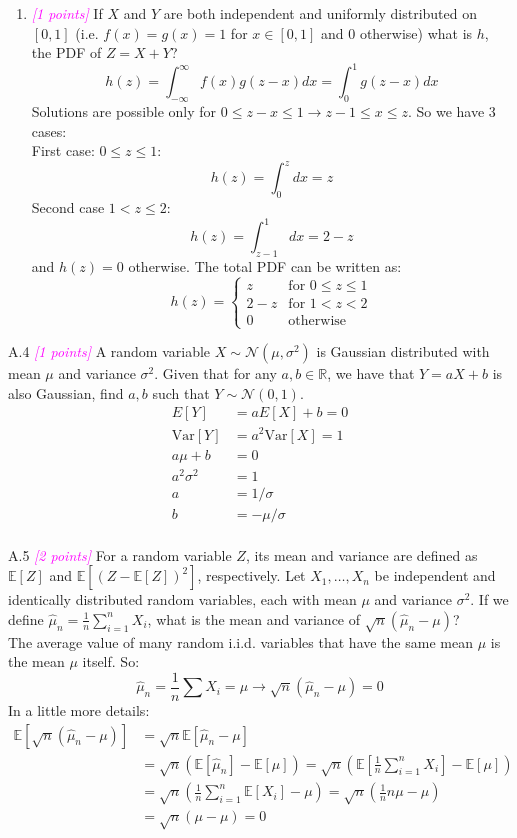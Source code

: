 \documentclass{article}
\newcommand{\field}[1]{\mathbb{#1}}
\newcommand{\1}{\mathbf{1}}
\newcommand{\E}{\mathbb{E}}
\newcommand{\R}{\field{R}} %
\newcommand{\points}[1]{\small\textcolor{magenta}{\emph{[#1 points]}} \normalsize}
\begin{document}
\begin{enumerate}
	\item \points{1} If $X$ and $Y$ are both independent and uniformly distributed on $[0,1]$ (i.e. $f(x)=g(x)=1$ for $x \in [0,1]$ and $0$ otherwise) what is $h$, the PDF of $Z=X+Y$? \\
    $$h(z) = \int_{-\infty}^\infty f(x)g(z-x)dx = \int_0^1g(z-x)dx$$
    Solutions are possible only for $0 \leq z-x \leq 1 \rightarrow z-1 \leq x \leq z$. So we have 3 cases:\\ First case: $0\leq z\leq 1$:
    $$h(z) = \int_0^zdx = z$$
    Second case $1 < z \leq 2$: 
    $$h(z) = \int_{z-1}^1dx = 2-z$$
    and $h(z)=0$ otherwise. The total PDF can be written as: 
    $$h(z) = \begin{cases} 
              z &\mbox{for } 0 \leq z \leq 1 \\ 
              2-z &\mbox{for } 1 < z < 2 \\
              0 &\mbox{otherwise } 
              \end{cases} 
    $$ 
    
\end{enumerate}

\newpage
A.4 \points{1} A random variable $X \sim \mathcal{N}(\mu, \sigma^2)$ is Gaussian distributed with mean $\mu$ and variance $\sigma^2$. Given that for any $a,b \in \R$, we have that $Y = aX + b$ is also Gaussian, find $a,b$ such that $Y \sim \mathcal{N}(0,1)$.
\begin{align*}
    E[Y] &= aE[X]+b = 0\\
    \text{Var}[Y] &= a^2\text{Var}[X] = 1\\
    a\mu + b &= 0\\
    a^2\sigma^2 &= 1\\
    a &= 1/\sigma\\
    b &= - \mu/\sigma\\
\end{align*}

A.5 \points{2} For a random variable $Z$, its mean and variance are defined as $\E[Z]$ and $\E[(Z-\E[Z])^2]$, respectively. Let $X_1,\dots,X_n$ be independent and identically distributed random variables, each with mean $\mu$ and variance $\sigma^2$. If we define $\widehat{\mu}_n = \frac{1}{n} \sum_{i=1}^n X_i$, what is the mean and variance of $\sqrt{n}(\widehat{\mu}_n - \mu)$? \\

The average value of many random i.i.d. variables that have the same mean $\mu$ is the mean $\mu$ itself. So:
$$\hat\mu_n = \frac{1}{n}\sum X_i = \mu \rightarrow \sqrt{n}(\hat\mu_n - \mu) = 0$$
In a little more details: 
\begin{align*}
\E[\sqrt{n}(\hat\mu_n - \mu)] &= \sqrt n \E\left[\hat\mu_n - \mu\right] \\
&=\sqrt n \left(\E[\hat\mu_n] - \E[\mu]\right) = \sqrt n \left(\E\left[\frac{1}{n} \sum_{i=1}^n X_i\right] - \E[\mu]\right)\\
&= \sqrt n \left(\frac{1}{n}\sum_{i=1}^n \E[X_i] - \mu\right) = \sqrt n \left(\frac{1}{n}n\mu - \mu\right) \\
&= \sqrt n (\mu - \mu) = 0
\end{align*}
\end{document}
